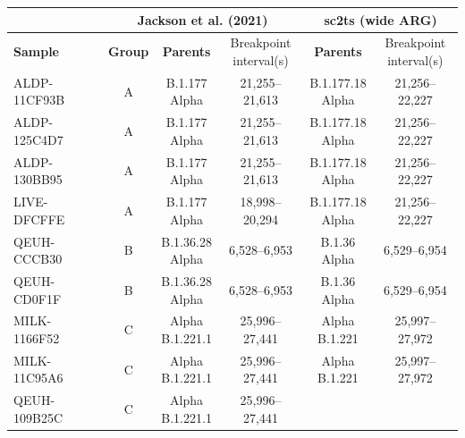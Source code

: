 \documentclass{article}
\begin{document}
\begin{table} \centering
\begin{tabular}{l|c|c|c|c|c} \hline
\multicolumn{1}{c}{} & \multicolumn{3}{c}{\textbf{Jackson et al. (2021)}} &
\multicolumn{2}{c}{\textbf{sc2ts (wide ARG)}} \\ \hline
\textbf{Sample} &
\textbf{Group} & \textbf{Parents} & \thead{Breakpoint \\
interval(s)} &
\textbf{Parents} & \thead{Breakpoint \\ interval(s)} \\
\hline ALDP-11CF93B & A
    & \thead{B.1.177 \\ Alpha} & 21,255–21,613 & \thead{B.1.177.18 \\ Alpha} &
21,256–22,227 \\
    ALDP-125C4D7 & A & \thead{B.1.177 \\ Alpha} & 21,255–21,613 &
    \thead{B.1.177.18 \\ Alpha} & 21,256–22,227 \\
ALDP-130BB95 & A & \thead{B.1.177 \\ Alpha} & 21,255–21,613 &
    \thead{B.1.177.18 \\ Alpha} & 21,256–22,227 \\
LIVE-DFCFFE & A & \thead{B.1.177 \\ Alpha} & 18,998–20,294 &
    \thead{B.1.177.18 \\ Alpha} & 21,256–22,227 \\
QEUH-CCCB30 & B & \thead{B.1.36.28 \\ Alpha} & 6,528–6,953 &
    \thead{B.1.36 \\ Alpha} & 6,529–6,954 \\
QEUH-CD0F1F & B & \thead{B.1.36.28 \\ Alpha} & 6,528–6,953 &
    \thead{B.1.36 \\ Alpha} & 6,529–6,954 \\
MILK-1166F52 & C & \thead{Alpha \\ B.1.221.1} & 25,996–27,441 &
    \thead{Alpha \\ B.1.221} & 25,997–27,972 \\
MILK-11C95A6 & C & \thead{Alpha \\ B.1.221.1} & 25,996–27,441 &
    \thead{Alpha \\ B.1.221} & 25,997–27,972 \\
QEUH-109B25C & C & \thead{Alpha \\ B.1.221.1} & 25,996–27,441 &

\end{tabular}
\end{table}
\end{document}
